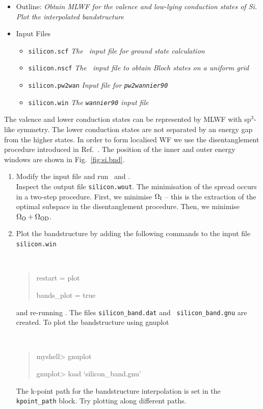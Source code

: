 \documentclass[a4paper,11pt,twoside]{article}
\begin{document}
\begin{itemize}
\item{Outline: \it{Obtain MLWF for the valence and low-lying
    conduction states of Si. Plot the interpolated bandstructure}} 
\item{Input Files}
\begin{itemize}
\item{ {\tt silicon.scf}  {\it The \pwscf\ input file for ground state
    calculation}} 
\item{ {\tt silicon.nscf}  {\it The \pwscf\ input file to obtain Bloch
    states on a uniform grid}} 
\item{ {\tt silicon.pw2wan}  {\it Input file for {\tt pw2wannier90}}}
\item{ {\tt silicon.win}  {\it The {\tt wannier90} input file}}
\end{itemize}
\end{itemize}
The valence and lower conduction states can be represented by MLWF
with sp$^3$-like symmetry. The lower conduction states are not 
separated by an energy gap from the higher states. In order to form
localised WF we use the disentanglement procedure
introduced in Ref.~\cite{SMV}. The position of the inner and outer
energy windows are shown in Fig.~\ref{fig:si.bnd}. 
\begin{enumerate}
\item Modify the input file and run \pwscf\ and \wannier.\\
Inspect the output file {\tt silicon.wout}. The minimisation of the
spread occurs in a two-step procedure. First, we minimise $\Omega_{\rm
  I}$ -- this is the extraction of the optimal subspace in the 
disentanglement procedure. Then, we minimise $\Omega_{\rm
  O}+\Omega_{{\rm OD}}$.

\item Plot the bandstructure by adding the following commands to the
 input file {\tt silicon.win}
{\tt
\begin{quote}
restart = plot

bands\_plot = true
\end{quote} }
and re-running \wannier. The files {\tt silicon\_band.dat} and {\tt
  silicon\_band.gnu} are created. To plot the bandstructure using
  gnuplot \smallskip
{\tt
\begin{quote}
myshell> gnuplot

gnuplot> load `silicon\_band.gnu'
\end{quote} }
The k-point path for the bandstructure interpolation is set in the {\tt
  kpoint\_path} block. Try plotting along different paths. 
\end{enumerate}
\end{document}
